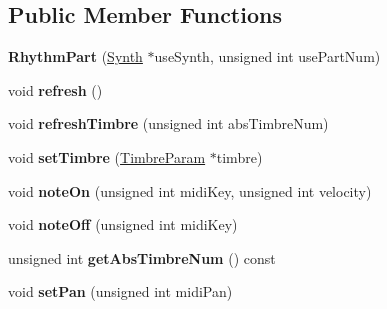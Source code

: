 \subsection*{Public Member Functions}
\begin{DoxyCompactItemize}
\item 
\hypertarget{classMT32Emu_1_1RhythmPart_a1d9bdf53d4f09775a20c2d32581e8956}{{\bfseries Rhythm\-Part} (\hyperlink{classMT32Emu_1_1Synth}{Synth} $\ast$use\-Synth, unsigned int use\-Part\-Num)}\label{classMT32Emu_1_1RhythmPart_a1d9bdf53d4f09775a20c2d32581e8956}

\item 
\hypertarget{classMT32Emu_1_1RhythmPart_aba2aae08b0cd79f37768ecf5c6ff1e6d}{void {\bfseries refresh} ()}\label{classMT32Emu_1_1RhythmPart_aba2aae08b0cd79f37768ecf5c6ff1e6d}

\item 
\hypertarget{classMT32Emu_1_1RhythmPart_ad0d9962371a2c402910ca2159da21a63}{void {\bfseries refresh\-Timbre} (unsigned int abs\-Timbre\-Num)}\label{classMT32Emu_1_1RhythmPart_ad0d9962371a2c402910ca2159da21a63}

\item 
\hypertarget{classMT32Emu_1_1RhythmPart_aa3a3607c4a3236a05956fdfecd8f11b2}{void {\bfseries set\-Timbre} (\hyperlink{structMT32Emu_1_1TimbreParam}{Timbre\-Param} $\ast$timbre)}\label{classMT32Emu_1_1RhythmPart_aa3a3607c4a3236a05956fdfecd8f11b2}

\item 
\hypertarget{classMT32Emu_1_1RhythmPart_a013de31dbdc1bd23c1d096bb9c667b79}{void {\bfseries note\-On} (unsigned int midi\-Key, unsigned int velocity)}\label{classMT32Emu_1_1RhythmPart_a013de31dbdc1bd23c1d096bb9c667b79}

\item 
\hypertarget{classMT32Emu_1_1RhythmPart_ae5f8498d78b51a3267d4ea39776721a8}{void {\bfseries note\-Off} (unsigned int midi\-Key)}\label{classMT32Emu_1_1RhythmPart_ae5f8498d78b51a3267d4ea39776721a8}

\item 
\hypertarget{classMT32Emu_1_1RhythmPart_af0c0f93043db3b546a32e0e8ea4a3f68}{unsigned int {\bfseries get\-Abs\-Timbre\-Num} () const }\label{classMT32Emu_1_1RhythmPart_af0c0f93043db3b546a32e0e8ea4a3f68}

\item 
\hypertarget{classMT32Emu_1_1RhythmPart_af8279e3faad0bd2bd1182caa3b07628b}{void {\bfseries set\-Pan} (unsigned int midi\-Pan)}\label{classMT32Emu_1_1RhythmPart_af8279e3faad0bd2bd1182caa3b07628b}


\end{DoxyCompactItemize}
